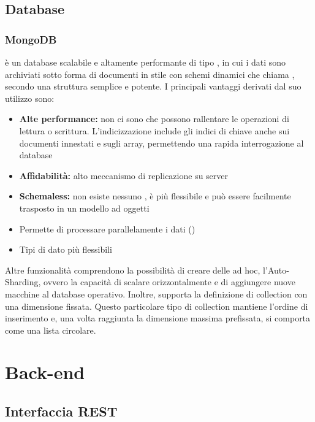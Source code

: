 \documentclass[12pt,a4paper]{article}
\begin{document}
\subsection{Database}
\subsubsection{MongoDB}\label{mongodb}
 è un database   scalabile e altamente performante di tipo , in cui i dati sono archiviati sotto forma di documenti in stile  con
schemi dinamici che  chiama , secondo una struttura semplice e potente.
I principali vantaggi derivati dal suo utilizzo sono:
\begin{itemize}
	\item \textbf{Alte performance:} non ci sono  che possono rallentare le operazioni di lettura o scrittura. L’indicizzazione include gli indici di chiave anche sui documenti innestati e sugli array, permettendo una rapida interrogazione al database
	\item \textbf{Affidabilità:} alto meccanismo di replicazione su server
	\item \textbf{Schemaless:} non esiste nessuno , è più flessibile e può essere facilmente trasposto in un modello ad oggetti
	\item Permette di processare parallelamente i dati ()
	\item Tipi di dato più flessibili
\end{itemize}
Altre funzionalità comprendono la possibilità di creare delle  ad hoc, l’Auto-Sharding, ovvero la capacità di scalare orizzontalmente e di aggiungere nuove macchine al database operativo.
Inoltre,  supporta la definizione di collection con una dimensione fissata. Questo particolare tipo di collection mantiene l’ordine di inserimento e, una volta raggiunta la dimensione massima prefissata, si comporta come una lista circolare.


\newpage
\section{Back-end}

\subsection{Interfaccia REST}
\end{document}
